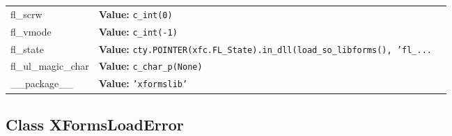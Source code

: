 \begin{longtable}{|p{\varnamewidth}|p{\vardescrwidth}|l}
\cline{1-2}
\raggedright f\-l\-\_\-s\-c\-r\-w\- & \raggedright \textbf{Value:} 
{\tt c\_int(0)}&\\
\cline{1-2}
\raggedright f\-l\-\_\-v\-m\-o\-d\-e\- & \raggedright \textbf{Value:} 
{\tt c\_int(-1)}&\\
\cline{1-2}
\raggedright f\-l\-\_\-s\-t\-a\-t\-e\- & \raggedright \textbf{Value:} 
{\tt cty.POINTER(xfc.FL\_State).in\_dll(load\_so\_libforms(), 'fl\_\texttt{...}}&\\
\cline{1-2}
\raggedright f\-l\-\_\-u\-l\-\_\-m\-a\-g\-i\-c\-\_\-c\-h\-a\-r\- & \raggedright \textbf{Value:} 
{\tt c\_char\_p(None)}&\\
\cline{1-2}
\raggedright \_\-\_\-p\-a\-c\-k\-a\-g\-e\-\_\-\_\- & \raggedright \textbf{Value:} 
{\tt \texttt{'}\texttt{xformslib}\texttt{'}}&\\
\cline{1-2}
\end{longtable}



\subsection{Class XFormsLoadError}

